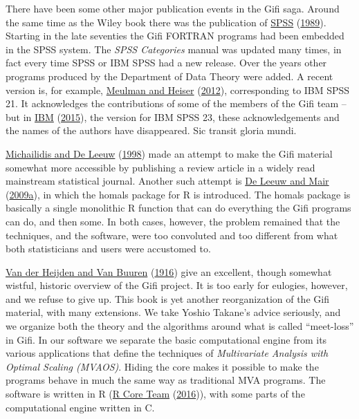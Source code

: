 \documentclass[
  12pt,
]{book}
\begin{document}
There have been some other major publication events in the Gifi saga. Around the same time as the Wiley book there was the publication of \protect\hyperlink{ref-spss_89}{SPSS} (\protect\hyperlink{ref-spss_89}{1989}). Starting in the late seventies the Gifi FORTRAN programs had been embedded in the SPSS system. The \emph{SPSS Categories} manual was updated many times, in fact every time SPSS or IBM SPSS had a new release. Over the years other programs produced by the Department of Data Theory were added. A recent version is, for example, \protect\hyperlink{ref-meulman_heiser_12}{Meulman and Heiser} (\protect\hyperlink{ref-meulman_heiser_12}{2012}), corresponding to IBM SPSS 21. It acknowledges the contributions of some of the members of the Gifi team -- but in \protect\hyperlink{ref-ibm_15}{IBM} (\protect\hyperlink{ref-ibm_15}{2015}), the version for IBM SPSS 23, these acknowledgements and the names of the authors have disappeared. Sic transit gloria mundi.

\protect\hyperlink{ref-michailidis_deleeuw_A_98}{Michailidis and De Leeuw} (\protect\hyperlink{ref-michailidis_deleeuw_A_98}{1998}) made an attempt to make the Gifi material somewhat more accessible by publishing a review article in a widely read mainstream statistical journal. Another such attempt is \protect\hyperlink{ref-deleeuw_mair_A_09a}{De Leeuw and Mair} (\protect\hyperlink{ref-deleeuw_mair_A_09a}{2009a}), in which the homals package for R is introduced. The homals package is basically a single monolithic R function that can do everything the Gifi programs can do, and then some. In both cases, however, the problem remained that the techniques, and the software, were too convoluted and too different from what both statisticians and users were accustomed to.

\protect\hyperlink{ref-vanderheijden_vanbuuren_16}{Van der Heijden and Van Buuren} (\protect\hyperlink{ref-vanderheijden_vanbuuren_16}{1916}) give an excellent, though somewhat wistful, historic overview of the Gifi project. It is too early for eulogies, however, and we refuse to give up. This book is yet another reorganization of the Gifi material, with many extensions. We take Yoshio Takane's advice seriously, and we organize both the theory and the algorithms around what is called ``meet-loss'' in Gifi. In our software we separate the basic computational engine from its various applications that define the techniques of \emph{Multivariate Analysis with Optimal Scaling (MVAOS)}. Hiding the core makes it possible to make the programs behave in much the same way as traditional MVA programs. The software is written in R (\protect\hyperlink{ref-r_core_team_16}{R Core Team} (\protect\hyperlink{ref-r_core_team_16}{2016})), with some parts of the computational engine written in C.
\end{document}
